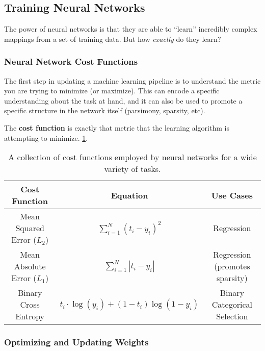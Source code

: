 \subsection{Training Neural Networks}

The power of neural networks is that they are able to ``learn'' incredibly complex mappings from a set of training data. But how \emph{exactly} do they learn?

\subsubsection{Neural Network Cost Functions}

The first step in updating a machine learning pipeline is to understand the metric you are trying to minimize (or maximize). This can encode a specific understanding about the task at hand, and it can also be used to promote a specific structure in the network itself (parsimony, sparsity, etc).

The \textbf{cost function} is exactly that metric that the learning algorithm is attempting to minimize. \cref{tab:cost-functions}.

\begin{center}
  \begin{table}[h!]
    \centering
    \begin{tabular}[h!]{c|c|c}
    \hline
    {\bf Cost Function} & {\bf Equation} & {\bf Use Cases}  \\ \hline
    Mean Squared Error ($L_{2}$) & $\sum_{i=1}^{N}(t_{i}-y_{i})^{2}$ & Regression \\ \hline
    Mean Absolute Error ($L_{1}$) & $\sum_{i=1}^{N}|t_{i} - y_{i}|$ & Regression (promotes sparsity) \\ \hline
    Binary Cross Entropy & $t_{i}\cdot \log (y_{i}) + (1 - t_{i})\log (1 - y_{i})$ & Binary Categorical Selection \\ \hline
    \end{tabular}
    \caption{A collection of cost functions employed by neural networks for a wide variety of tasks.}
    \label{tab:cost-functions}
  \end{table}
\end{center}

\subsubsection{Optimizing and Updating Weights}

